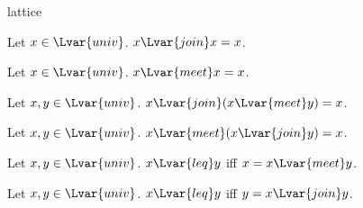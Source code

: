 \documentclass{stex}
\begin{document}
\begin{smodule}{lattice}
\begin{forthel}
    \begin{proposition*}
      Let $x \in \Lvar{univ}$.
      $x {\Lvar{join}} x = x$.
    \end{proposition*}

    \begin{proposition*}
      Let $x \in \Lvar{univ}$.
      $x {\Lvar{meet}} x = x$.
    \end{proposition*}

    \begin{proposition*}
      Let $x, y \in \Lvar{univ}$.
      $x {\Lvar{join}} (x {\Lvar{meet}} y) = x$.
    \end{proposition*}

    \begin{proposition*}
      Let $x, y \in \Lvar{univ}$.
      $x {\Lvar{meet}} (x {\Lvar{join}} y) = x$.
    \end{proposition*}

    \begin{proposition*}
      Let $x, y \in \Lvar{univ}$.
      $x {\Lvar{leq}} y$ iff $x = x {\Lvar{meet}} y$.
    \end{proposition*}

    \begin{proposition*}
      Let $x, y \in \Lvar{univ}$.
      $x {\Lvar{leq}}y$ iff $y = x {\Lvar{join}} y$.
    \end{proposition*}
  \end{forthel}
\end{smodule}
\end{document}
